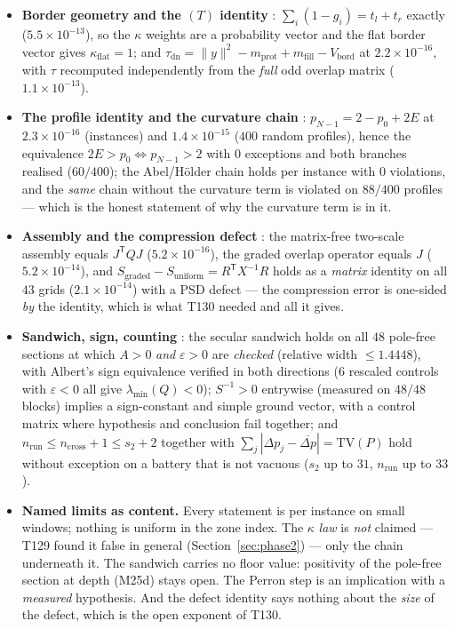 \documentclass[11pt,a4paper]{article}
\begin{document}
\begin{itemize}[leftmargin=1.5em]
\item \textbf{Border geometry and the $(T)$ identity} \mE: $\sum_i(1-g_i)=t_l+t_r$ exactly
($5.5\times10^{-13}$), so the $\kappa$ weights are a probability vector and the flat border vector
gives $\kappa_{\mathrm{flat}}=1$; and
$\tau_{\mathrm{dn}}=\|y\|^2-m_{\mathrm{prot}}+m_{\mathrm{fill}}-V_{\mathrm{bord}}$ at
$2.2\times10^{-16}$, with $\tau$ recomputed independently from the \emph{full} odd overlap matrix
($1.1\times10^{-13}$).
\item \textbf{The profile identity and the curvature chain} \mE: $p_{N-1}=2-p_0+2E$ at
$2.3\times10^{-16}$ (instances) and $1.4\times10^{-15}$ ($400$ random profiles), hence the
equivalence $2E>p_0\iff p_{N-1}>2$ with $0$ exceptions and both branches realised ($60/400$); the
Abel/H\"older chain holds per instance with $0$ violations, and the \emph{same} chain without the
curvature term is violated on $88/400$ profiles --- which is the honest statement of why the
curvature term is in it.
\item \textbf{Assembly and the compression defect} \mE: the matrix-free two-scale assembly equals
$J^{\mathsf T}QJ$ ($5.2\times10^{-16}$), the graded overlap operator equals $J$
($5.2\times10^{-14}$), and $S_{\mathrm{graded}}-S_{\mathrm{uniform}}=R^{\mathsf T}X^{-1}R$ holds as a
\emph{matrix} identity on all $43$ grids ($2.1\times10^{-14}$) with a PSD defect --- the compression
error is one-sided \emph{by} the identity, which is what T130 needed and all it gives.
\item \textbf{Sandwich, sign, counting} \mE: the secular sandwich holds on all $48$ pole-free
sections at which $A>0$ \emph{and} $\varepsilon>0$ are \emph{checked} (relative width $\le1.4448$),
with Albert's sign equivalence verified in both directions ($6$ rescaled controls with
$\varepsilon<0$ all give $\lambda_{\min}(Q)<0$); $S^{-1}>0$ entrywise (measured on $48/48$ blocks)
implies a sign-constant and simple ground vector, with a control matrix where hypothesis and
conclusion fail together; and $n_{\mathrm{run}}\le n_{\mathrm{cross}}+1\le s_2+2$ together with
$\sum_j|\Delta p_j-\overline{\Delta p}|=\mathrm{TV}(P)$ hold without exception on a battery that is
not vacuous ($s_2$ up to $31$, $n_{\mathrm{run}}$ up to $33$).
\item \textbf{Named limits as content.} Every statement is per instance on small windows; nothing is
uniform in the zone index. The $\kappa$ \emph{law} is \emph{not} claimed --- T129 found it false in
general (Section~\ref{sec:phase2}) --- only the chain underneath it. The sandwich carries no floor
value: positivity of the pole-free section at depth (M25d) stays open. The Perron step is an
implication with a \emph{measured} hypothesis. And the defect identity says nothing about the
\emph{size} of the defect, which is the open exponent of T130.
\end{itemize}
\end{document}

